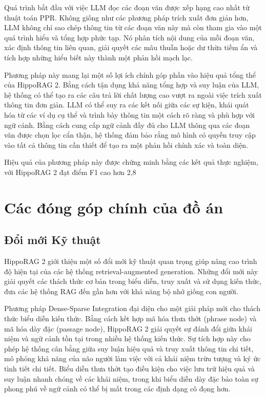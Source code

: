 \documentclass[../main.tex]{subfiles}
\begin{document}
Quá trình bắt đầu với việc LLM đọc các đoạn văn được xếp hạng cao nhất từ thuật toán PPR. Không giống như các phương pháp trích xuất đơn giản hơn, LLM không chỉ sao chép thông tin từ các đoạn văn này mà còn tham gia vào một quá trình hiểu và tổng hợp phức tạp. Nó phân tích nội dung của mỗi đoạn văn, xác định thông tin liên quan, giải quyết các mâu thuẫn hoặc dư thừa tiềm ẩn và tích hợp những hiểu biết này thành một phản hồi mạch lạc.

Phương pháp này mang lại một số lợi ích chính góp phần vào hiệu quả tổng thể của HippoRAG 2. Bằng cách tận dụng khả năng tổng hợp và suy luận của LLM, hệ thống có thể tạo ra các câu trả lời chất lượng cao vượt ra ngoài việc trích xuất thông tin đơn giản. LLM có thể suy ra các kết nối giữa các sự kiện, khái quát hóa từ các ví dụ cụ thể và trình bày thông tin một cách rõ ràng và phù hợp với ngữ cảnh. Bằng cách cung cấp ngữ cảnh đầy đủ cho LLM thông qua các đoạn văn được chọn lọc cẩn thận, hệ thống đảm bảo rằng mô hình có quyền truy cập vào tất cả thông tin cần thiết để tạo ra một phản hồi chính xác và toàn diện.

Hiệu quả của phương pháp này được chứng minh bằng các kết quả thực nghiệm, với HippoRAG 2 đạt điểm F1 cao hơn 2,8%

\section{Các đóng góp chính của đồ án}
\subsection{Đổi mới Kỹ thuật}
HippoRAG 2 giới thiệu một số đổi mới kỹ thuật quan trọng giúp nâng cao trình độ hiện tại của các hệ thống retrieval-augmented generation. Những đổi mới này giải quyết các thách thức cơ bản trong biểu diễn, truy xuất và sử dụng kiến thức, đưa các hệ thống RAG đến gần hơn với khả năng bộ nhớ giống con người.

Phương pháp Dense-Sparse Integration đại diện cho một giải pháp mới cho thách thức biểu diễn kiến thức. Bằng cách kết hợp mã hóa thưa thớt (phrase node) và mã hóa dày đặc (passage node), HippoRAG 2 giải quyết sự đánh đổi giữa khái niệm và ngữ cảnh tồn tại trong nhiều hệ thống kiến thức. Sự tích hợp này cho phép hệ thống cân bằng giữa suy luận hiệu quả và truy xuất thông tin chi tiết, mô phỏng khả năng của não người làm việc với cả khái niệm trừu tượng và ký ức tình tiết chi tiết. Biểu diễn thưa thớt tạo điều kiện cho việc lưu trữ hiệu quả và suy luận nhanh chóng về các khái niệm, trong khi biểu diễn dày đặc bảo toàn sự phong phú về ngữ cảnh có thể bị mất trong các định dạng cô đọng hơn.
\end{document}
